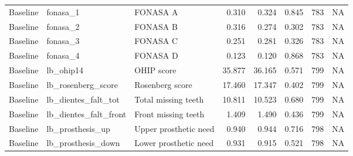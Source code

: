 \begin{table}
\begin{tabular}[t]{lllrrrrr}
Baseline & fonasa\_1 & FONASA A & 0.310 & 0.324 & 0.845 & 783 & NA\\
Baseline & fonasa\_2 & FONASA B & 0.316 & 0.274 & 0.302 & 783 & NA\\
Baseline & fonasa\_3 & FONASA C & 0.251 & 0.281 & 0.326 & 783 & NA\\
\addlinespace
Baseline & fonasa\_4 & FONASA D & 0.123 & 0.120 & 0.868 & 783 & NA\\
Baseline & lb\_ohip14 & OHIP score & 35.877 & 36.165 & 0.571 & 799 & NA\\
Baseline & lb\_rosenberg\_score & Rosenberg score & 17.460 & 17.347 & 0.402 & 799 & NA\\
Baseline & lb\_dientes\_falt\_tot & Total missing teeth & 10.811 & 10.523 & 0.680 & 799 & NA\\
Baseline & lb\_dientes\_falt\_front & Front missing teeth & 1.409 & 1.490 & 0.436 & 799 & NA\\
\addlinespace
Baseline & lb\_prosthesis\_up & Upper prosthetic need & 0.940 & 0.944 & 0.716 & 798 & NA\\
Baseline & lb\_prosthesis\_down & Lower prosthetic need & 0.931 & 0.915 & 0.521 & 798 & NA\\
\bottomrule
\end{tabular}
\end{table}
